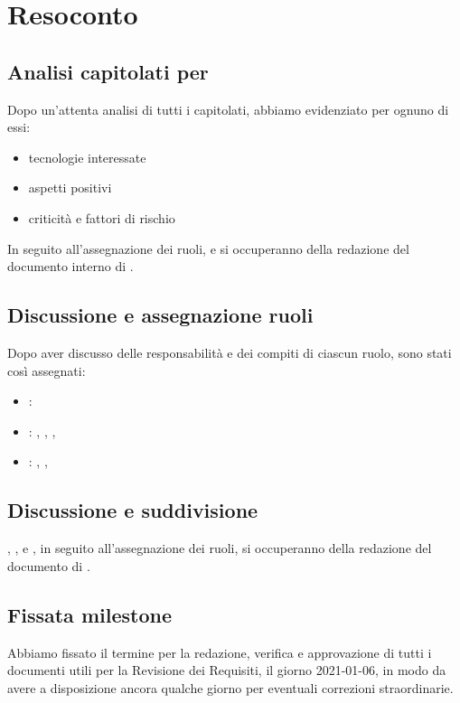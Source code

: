 \section{Resoconto}

\subsection{Analisi capitolati per \SdF}
Dopo un'attenta analisi di tutti i capitolati, abbiamo evidenziato per ognuno di essi:
	\begin{itemize}
		\item tecnologie interessate
		\item aspetti positivi
		\item criticità e fattori di rischio
	\end{itemize}
In seguito all'assegnazione dei ruoli, \GB{} e \MDI{} si occuperanno della redazione del documento interno di \SdF .

\subsection{Discussione e assegnazione ruoli}
Dopo aver discusso delle responsabilità e dei compiti di ciascun ruolo, sono stati così assegnati:
	\begin{itemize}
		\item \respProg : \MB
		\item \ammProg : \SB , \FD , \NM , \VAS
		\item \analProg : \GB , \MDI , \MB
	\end{itemize}

\subsection{Discussione e suddivisione \NdP}
\SB , \FD , \NM{} e \VAS{}, in seguito all'assegnazione dei ruoli, si occuperanno della redazione del documento di \NdP .

\subsection{Fissata milestone}
Abbiamo fissato il termine per la redazione, verifica e approvazione di tutti i documenti utili per la Revisione dei Requisiti, il giorno 2021-01-06, in modo da avere a disposizione ancora qualche giorno per eventuali correzioni straordinarie.